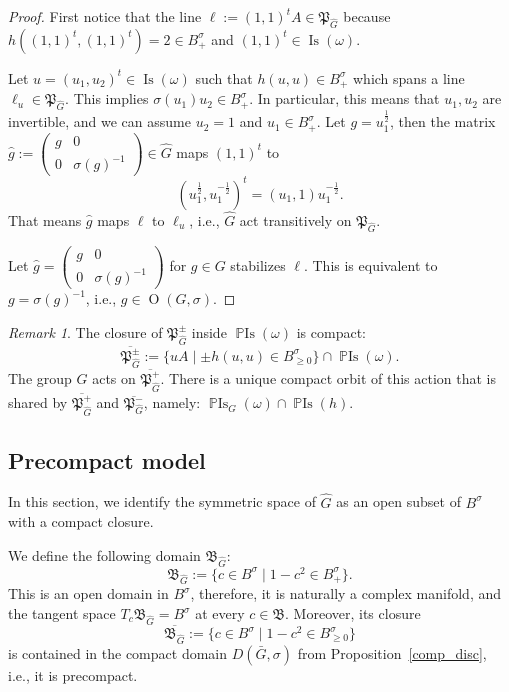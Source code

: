 \documentclass[a4paper,oneside,11pt]{amsart}
\DeclareMathOperator{\OO}{O}
\DeclareMathOperator{\Is}{Is}
\DeclareMathOperator{\PIs}{\mathbb{P}Is}
\theoremstyle{plain}
\theoremstyle{definition}
\theoremstyle{remark}
\newtheorem{rem}[teo]{Remark}
\begin{document}
\begin{proof}
    First notice that the line $\ell:=(1,1)^tA \in \mathfrak P_{\hat G}$ because $h((1,1)^t,(1,1)^t)=2\in B^\sigma_+$ and $(1,1)^t\in \Is(\omega)$.

    Let $u=(u_1,u_2)^t\in\Is(\omega)$ such that $h(u,u)\in B^\sigma_+$ which spans a line $\ell_u\in \mathfrak P_{\hat G}$. This implies $\sigma(u_1)u_2\in B^\sigma_+$. In particular, this means that $u_1,u_2$ are invertible, and we can assume $u_2=1$ and $u_1\in B^\sigma_+$. Let $g=u_1^{\frac{1}{2}}$, then the matrix $\hat g:=\begin{pmatrix}
        g & 0\\
        0  & \sigma(g)^{-1}
    \end{pmatrix}\in \hat G$ maps $(1,1)^t$ to $$(u_1^{\frac{1}{2}}, u_1^{-\frac{1}{2}})^t=(u_1,1)u_1^{-\frac{1}{2}}.$$
    That means $\hat g$ maps $\ell$ to $\ell_u$, i.e., $\hat G$ act transitively on $\mathfrak P_{\hat G}$.

    Let $\hat g=\begin{pmatrix}
        g & 0 \\
        0 & \sigma(g)^{-1}
    \end{pmatrix}$ for $g\in G$ stabilizes $\ell$. This is equivalent to $g=\sigma(g)^{-1}$, i.e., $g\in\OO(G,\sigma)$.
\end{proof}

\begin{rem}
    The closure of $\mathfrak P^\pm_{\hat G}$ inside $\PIs(\omega)$ is compact:
    $$\overline{\mathfrak P_{\hat G}^\pm}:=\{uA \mid \pm h(u,u)\in B^\sigma_{\geq 0}\}\cap\PIs(\omega).$$
    The group $\hat G$ acts on $\overline{\mathfrak P_{\hat G}^+}$. There is a unique compact orbit of this action that is shared by $\overline{\mathfrak P_{\hat G}^+}$ and $\overline{\mathfrak P_{\hat G}^-}$, namely: $\PIs_G(\omega)\cap\PIs(h)$.
\end{rem}

\subsection{Precompact model}\label{G-Precomp_Mod_R}

In this section, we identify the symmetric space of $\hat G$ as an open subset of $B^\sigma$ with a compact closure. 

We define the following domain $\mathfrak B_{\hat G}$:
$$\mathfrak B_{\hat G}\!:=\{c\in B^\sigma\mid 1-c^2\in B^{\sigma}_+\}.$$
This is an open domain in $B^\sigma$, therefore, it is naturally a complex manifold, and the tangent space $T_c\mathfrak B_{\hat G}=B^\sigma$ at every $c\in \mathfrak B$. Moreover, its closure
$$\overline{\mathfrak B_{\hat G}}\!:=\{c\in B^\sigma\mid 1-c^2\in B^{\sigma}_{\geq 0}\}$$
is contained in the compact domain $D(\bar G,\sigma)$ from Proposition~\ref{comp_disc}, i.e., it is precompact.
\end{document}
